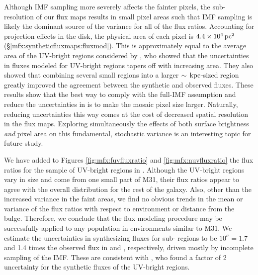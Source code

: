 Although IMF sampling more severely affects the fainter pixels, the sub-\kpc{}
resolution of our flux maps results in small pixel areas such that IMF sampling
is likely the dominant source of the variance for all of the flux ratios.
Accounting for projection effects in the disk, the physical area of each pixel
is $4.4\times 10^4\,\mathrm{pc}^2$ (\S \ref{mfx:syntheticfluxmaps:fluxmod}). This is
approximately equal to the average area of the UV-bright regions considered by
\citet{Simones:2014}, who showed that the uncertainties in fluxes modeled for
UV-bright regions tapers off with increasing area. They also showed that
combining several small regions into a larger $\sim\,\mathrm{kpc}$-sized region greatly
improved the agreement between the synthetic and observed fluxes. These results
show that the best way to comply with the full-IMF assumption and reduce the
uncertainties in \fxsfh{} is to make the mosaic pixel size larger. Naturally,
reducing uncertainties this way comes at the cost of decreased spatial
resolution in the flux maps. Exploring simultaneously the effects of both
surface brightness \emph{and} pixel area on this fundamental, stochastic
variance is an interesting topic for future study.

We have added to Figures \ref{fig:mfx:fuvfluxratio} and
\ref{fig:mfx:nuvfluxratio} the flux ratios for the sample of UV-bright regions
in \citet{Simones:2014}. Although the UV-bright regions vary in size and come
from one small part of M31, their flux ratios appear to agree with the overall
distribution for the rest of the galaxy. Also, other than the increased
variance in the faint areas, we find no obvious trends in the mean or variance
of the flux ratios with respect to environment or distance from the bulge.
Therefore, we conclude that the flux modeling procedure may be successfully
applied to any population in environments similar to M31. We estimate the
uncertainties in synthesizing fluxes for sub-\kpc{} regions to be $10^\sigma =
1.7$ and 1.4 times the observed flux in \fuv{} and \nuv{}, respectively, driven
mostly by incomplete sampling of the IMF. These are consistent with
\citet{Simones:2014}, who found a factor of 2 uncertainty for the synthetic
fluxes of the UV-bright regions.


